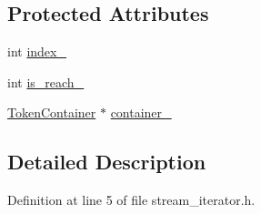 \subsection*{Protected Attributes}
\begin{DoxyCompactItemize}
\item 
int \hyperlink{classmocha_1_1_stream_iterator_base_aa4341829efe40989d579b97a587c0222}{index\_\-}
\item 
int \hyperlink{classmocha_1_1_stream_iterator_base_a841ac33532a6c401889af7a6b24135a9}{is\_\-reach\_\-}
\item 
\hyperlink{classmocha_1_1_token_container}{TokenContainer} $\ast$ \hyperlink{classmocha_1_1_stream_iterator_base_aa5b3ecce1694237f31b96c1f999693cc}{container\_\-}
\end{DoxyCompactItemize}


\subsection{Detailed Description}


Definition at line 5 of file stream\_\-iterator.h.



